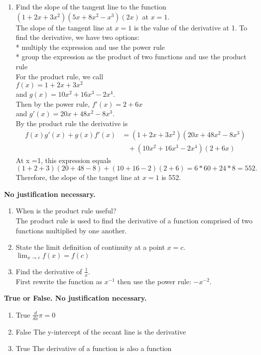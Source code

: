 \documentclass[a4paper, 12pt]{article}
\newcommand{\bt}[1]{\textbf{#1}} %
\newcommand{\eq}[1]{\begin{align*}#1\end{align*}} %
\renewcommand{\eq}[1]{\begin{align*}#1\end{align*}} %
\newcommand{\green}[1]{\textcolor{javagreen}{#1}} %
\begin{document}
\begin{enumerate}
    \item Find the slope of the tangent line to the function 
    $(1+2x + 3x^2)(5x +8x^2-x^3)(2x)$ at $x=1$. \\
    \green{
    The slope of the tangent line at $x=1$ is the value of the derivative at 1.
    To find the derivative, we have two options: \\
    * multiply the expression and use the power rule \\
    * group the expression as the product of two functions and use the product rule \\
    For the product rule, we call \\
    $f(x) = 1 + 2x + 3x^2$ \\ and $g(x) = 10x^2 + 16x^3 - 2x^4$.\\
    Then by the power rule, $f'(x) = 2 + 6x$\\ and $g'(x) = 20x + 48x^2 -8x^3.$ \\
    By the product rule the derivative is 
    \eq{ f(x) g'(x) + g(x)f'(x)  
    &= (1+2x+3x^2)(20x+48x^2-8x^3)  \\
    &\ \ \ \ + (10x^2+16x^3-2x^4)(2+6x)
    }
    At x =1, this expression equals 
    $$(1 + 2 + 3)(20 + 48-8) + (10 + 16 -2)(2+6) = 6*60 + 24*8 = 552.$$
    Therefore, the slope of the tanget line at $x=1$ is 552.
    }
\end{enumerate}

\bt{No justification necessary.}

\begin{enumerate}[resume]
    \item When is the product rule useful? \\
    \green{The product rule is used to find the derivative of a function comprised of two functions
    multiplied by one another.
    }
    \item State the limit definition of continuity at a point $x=c$. \\
    \green{$\lim_{x \rightarrow c} f(x) = f(c)$
    }
    
    \item Find the derivative of $\frac{1}{x}$. \\
    \green{First rewrite the function as $x^{-1}$ then use the power rule: 
    $-x^{-2}$.
    }
\end{enumerate}

\bt{True or False. No justification necessary.}

\begin{enumerate}[resume]
    \item \green{True} $\frac{d}{dx} \pi = 0$
    \item \green{False} The y-intercept of the secant line is the derivative
    \item \green{True} The derivative of a function is also a function
\end{enumerate}
\end{document}
